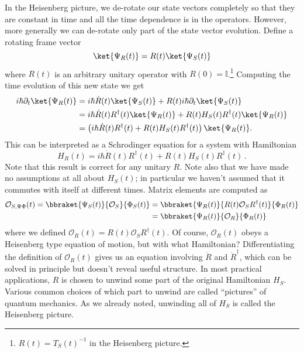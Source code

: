 In the Heisenberg picture, we de-rotate our state vectors completely so that they are constant in time and all the time dependence is in the operators.
However, more generally we can de-rotate only part of the state vector evolution.
Define a rotating frame vector
\begin{equation}
  \ket{\Psi_R(t)} = R(t) \ket{\Psi_S(t)}
\end{equation}
where $R(t)$ is an arbitrary unitary operator with $R(0) = \mathbb{I}$.\footnote{$R(t) = T_S(t)^{-1}$ in the Heisenberg picture.}
Computing the time evolution of this new state we get
\begin{align}
  i\hbar\partial_t \ket{\Psi_R(t)} &= i\hbar \dot{R}(t) \ket{\Psi_S(t)} + R(t) i \hbar\partial_t\ket{\Psi_S(t)} \nonumber \\
  &= i\hbar \dot{R}(t)R^{\dagger}(t) \ket{\Psi_R(t)} + R(t) H_S(t) R^{\dagger}(t) \ket{\Psi_R(t)} \nonumber \\
  &= \left( i\hbar \dot{R}(t)R^\dagger(t) + R(t) H_S(t) R^{\dagger}(t) \right) \ket{\Psi_R(t)}.
\end{align}
This can be interpreted as a Schrodinger equation for a system with Hamiltonian
\begin{equation}
  H_R(t) = i\hbar \dot{R}(t)R^{\dagger}(t) + R(t) H_S(t) R^{\dagger}(t) \, .
\end{equation}
Note that this result is correct for any unitary $R$.
Note also that we have made no assumptions at all about $H_S(t)$; in particular we haven't assumed that it commutes with itself at different times.
Matrix elements are computed as
\begin{align}
  \mathcal{O}_{S,\Psi\Phi}(t) = \bbraket{\Psi_S(t)}{\mathcal{O}_S}{\Phi_S(t)}
  &= \bbraket{\Psi_R(t)}{R(t) \mathcal{O}_S R^\dagger(t)}{\Phi_R(t)} \nonumber \\
  &= \bbraket{\Psi_R(t)}{\mathcal{O}_R}{\Phi_R(t)}
\end{align}
where we defined $\mathcal{O}_R(t) = R(t) \mathcal{O}_S R^\dagger(t)$.
Of course, $\mathcal{O}_R(t)$ obeys a Heisenberg type equation of motion, but with what Hamiltonian?
Differentiating the definition of $\mathcal{O}_R(t)$ gives us an equation involving $\dot{R}$ and $\dot{R}^\dagger$, which can be solved in principle but doesn't reveal useful structure.
In most practical applications, $R$ is chosen to unwind some part of the original Hamiltonian $H_S$.
Various common choices of which part to unwind are called ``pictures'' of quantum mechanics.
As we already noted, unwinding all of $H_S$ is called the Heisenberg picture.
